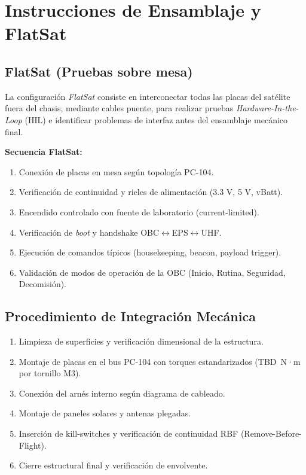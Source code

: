 
\section{Instrucciones de Ensamblaje y FlatSat}

\subsection{FlatSat (Pruebas sobre mesa)}
La configuración \textit{FlatSat} consiste en interconectar todas las placas del satélite
fuera del chasis, mediante cables puente, para realizar pruebas
\textit{Hardware-In-the-Loop} (HIL) e identificar problemas de interfaz antes del
ensamblaje mecánico final.

\textbf{Secuencia FlatSat:}
\begin{enumerate}
    \item Conexión de placas en mesa según topología PC-104.
    \item Verificación de continuidad y rieles de alimentación (3.3 V, 5 V, vBatt).
    \item Encendido controlado con fuente de laboratorio (current-limited).
    \item Verificación de \textit{boot} y handshake OBC$\leftrightarrow$EPS$\leftrightarrow$UHF.
    \item Ejecución de comandos típicos (housekeeping, beacon, payload trigger).
    \item Validación de modos de operación de la OBC (Inicio, Rutina, Seguridad, Decomisión).
\end{enumerate}

\subsection{Procedimiento de Integración Mecánica}
\begin{enumerate}
    \item Limpieza de superficies y verificación dimensional de la estructura.
    \item Montaje de placas en el bus PC-104 con torques estandarizados (TBD~N·m por tornillo M3).
    \item Conexión del arnés interno según diagrama de cableado.
    \item Montaje de paneles solares y antenas plegadas.
    \item Inserción de kill-switches y verificación de continuidad RBF (Remove-Before-Flight).
    \item Cierre estructural final y verificación de envolvente.
\end{enumerate}

